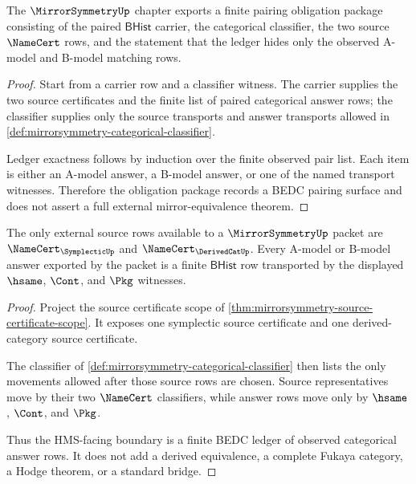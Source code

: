 \begin{theorem}
\label{thm:mirrorsymmetry-pairing-obligation-package}
The $\MirrorSymmetryUp$ chapter exports a finite pairing obligation package consisting of the paired $\mathsf{BHist}$ carrier, the categorical classifier, the two source $\NameCert$ rows, and the statement that the ledger hides only the observed A-model and B-model matching rows.
\end{theorem}
\begin{proof}
Start from a carrier row and a classifier witness. The carrier supplies the two source certificates and the finite list of paired categorical answer rows; the classifier supplies only the source transports and answer transports allowed in \autoref{def:mirrorsymmetry-categorical-classifier}.

Ledger exactness follows by induction over the finite observed pair list. Each item is either an A-model answer, a B-model answer, or one of the named transport witnesses. Therefore the obligation package records a BEDC pairing surface and does not assert a full external mirror-equivalence theorem.
\end{proof}

\begin{theorem}
\label{thm:mirrorsymmetry-hms-source-boundary}
The only external source rows available to a $\MirrorSymmetryUp$ packet are
$\NameCert_{\SymplecticUp}$ and $\NameCert_{\DerivedCatUp}$. Every A-model or
B-model answer exported by the packet is a finite $\mathsf{BHist}$ row
transported by the displayed $\hsame$, $\Cont$, and $\Pkg$ witnesses.
\end{theorem}
\begin{proof}
Project the source certificate scope of
\autoref{thm:mirrorsymmetry-source-certificate-scope}. It exposes one
symplectic source certificate and one derived-category source certificate.

The classifier of \autoref{def:mirrorsymmetry-categorical-classifier} then
lists the only movements allowed after those source rows are chosen. Source
representatives move by their two $\NameCert$ classifiers, while answer rows
move only by $\hsame$, $\Cont$, and $\Pkg$.

Thus the HMS-facing boundary is a finite BEDC ledger of observed categorical
answer rows. It does not add a derived equivalence, a complete Fukaya category,
a Hodge theorem, or a standard bridge.
\end{proof}

